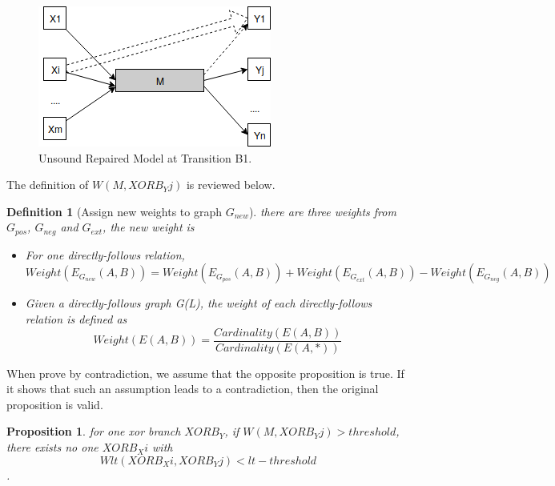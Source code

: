 \documentclass[]{article}
\newtheorem{mydef}{Definition}[section]
\newtheorem{myproposition}{Proposition}[section]
\begin{document}
\begin{figure}[!h]
	\includegraphics[width=\textwidth]{RelationOfThreshold-LTThreshold.png}
	\caption{Unsound Repaired Model at Transition B1.}
	\label{fig:simplified-graph-model}
\end{figure}

The definition of $W(M, XORB_Yj)$ is reviewed below.
\begin{mydef}[Assign new weights to graph $G_{new}$]
	there are three weights from $G_{pos}$, $G_{neg}$ and $G_{ext}$, the new weight is 
	\begin{itemize}
		\item For one directly-follows relation, \[ Weight(E_{G_{new}}(A,B)) = Weight(E_{G_{pos}}(A,B)) + Weight(E_{G_{ext}}(A,B)) - Weight(E_{G_{neg}}(A,B))\]
		\item Given a directly-follows graph G(L), the weight of each directly-follows relation is defined as \[ Weight(E(A,B)) = \frac{Cardinality(E(A,B))}{Cardinality(E(A,*))}  \] 
	\end{itemize}
\end{mydef}

When prove by contradiction, we assume that the opposite proposition is true. If it shows that such an assumption leads to a contradiction, then the original proposition is valid. 
\begin{myproposition}
	for one xor branch $XORB_Y$, if $W(M, XORB_Yj) > threshold$, \\ there exists no one $XORB_Xi$ with 
	\[Wlt(XORB_Xi, XORB_Yj)<lt-threshold\]. 
\end{myproposition}
\end{document}
